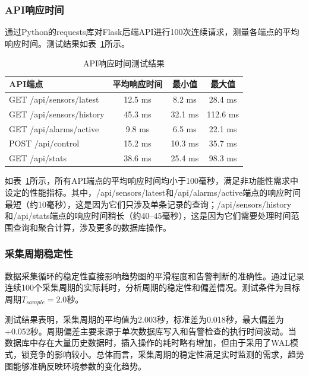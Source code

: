 \documentclass[12pt,a4paper]{ctexart}
\begin{document}
\subsubsection{API响应时间}

通过Python的requests库对Flask后端API进行100次连续请求，测量各端点的平均响应时间。测试结果如表~\ref{tab:perf_api}所示。

\begin{table}[H]
    \centering
    \caption{API响应时间测试结果}
    \label{tab:perf_api}
    \begin{tabular}{@{}lccc@{}}
        \toprule
        \textbf{API端点} & \textbf{平均响应时间} & \textbf{最小值} & \textbf{最大值} \\
        \midrule
        GET /api/sensors/latest & 12.5 ms & 8.2 ms & 28.4 ms \\
        GET /api/sensors/history & 45.3 ms & 32.1 ms & 112.6 ms \\
        GET /api/alarms/active & 9.8 ms & 6.5 ms & 22.1 ms \\
        POST /api/control & 15.2 ms & 10.3 ms & 35.7 ms \\
        GET /api/stats & 38.6 ms & 25.4 ms & 98.3 ms \\
        \bottomrule
    \end{tabular}
\end{table}

如表~\ref{tab:perf_api}所示，所有API端点的平均响应时间均小于100毫秒，满足非功能性需求中设定的性能指标。其中，/api/sensors/latest和/api/alarms/active端点的响应时间最短（约10毫秒），这是因为它们只涉及单条记录的查询；/api/sensors/history和/api/stats端点的响应时间稍长（约40--45毫秒），这是因为它们需要处理时间范围查询和聚合计算，涉及更多的数据库操作。

\subsubsection{采集周期稳定性}

数据采集循环的稳定性直接影响趋势图的平滑程度和告警判断的准确性。通过记录连续100个采集周期的实际耗时，分析周期的稳定性和偏差情况。测试条件为目标周期$T_{sample} = 2.0$秒。

测试结果表明，采集周期的平均值为2.003秒，标准差为0.018秒，最大偏差为+0.052秒。周期偏差主要来源于单次数据库写入和告警检查的执行时间波动。当数据库中存在大量历史数据时，插入操作的耗时略有增加，但由于采用了WAL模式，锁竞争的影响较小。总体而言，采集周期的稳定性满足实时监测的需求，趋势图能够准确反映环境参数的变化趋势。
\end{document}
